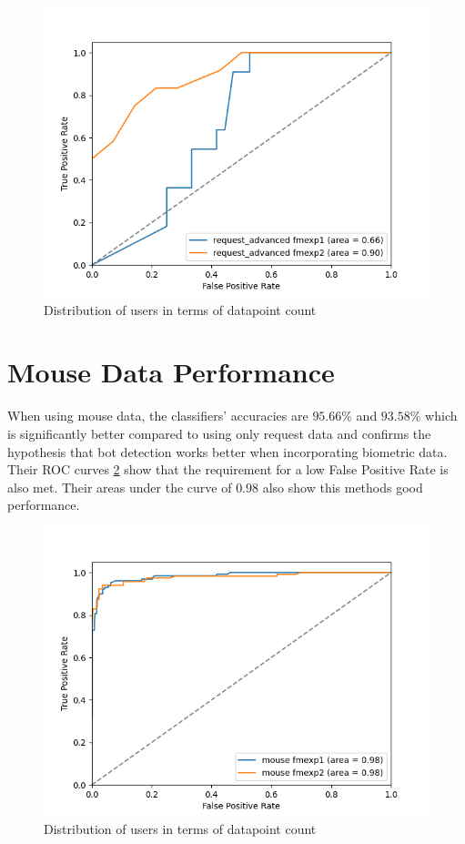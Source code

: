 \documentclass[
    fontsize=12pt,
    headings=small,
    parskip=half,           %
    bibliography=totoc,
    numbers=noenddot,       %
    open=any,               %
    final                   %
]{scrreprt}
\begin{document}
\begin{figure}[h]
	\includegraphics[width=\textwidth]{figures/roc_request_both_instances.png}
	\caption{Distribution of users in terms of datapoint count}
	\label{fig:roc_request_both_instances}
\end{figure}


\section{Mouse Data Performance}


When using mouse data, the classifiers' accuracies are $95.66\%$ and $93.58\%$ which is significantly better compared to using only request data and confirms the hypothesis that bot detection works better when incorporating biometric data. Their ROC curves \ref{fig:roc_mouse_both_instances} show that the requirement for a low False Positive Rate is also met. Their areas under the curve of $0.98$ also show this methods good performance.

\begin{figure}[h]
	\includegraphics[width=\textwidth]{figures/roc_mouse_both_instances.png}
	\caption{Distribution of users in terms of datapoint count}
	\label{fig:roc_mouse_both_instances}
\end{figure}
\end{document}

